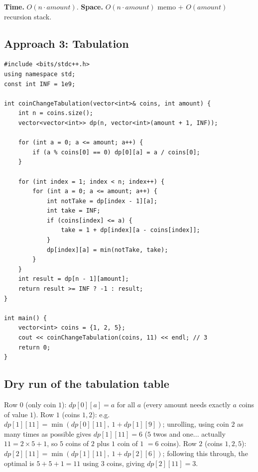 \begin{complexitybox}
\textbf{Time.} $O(n \cdot \textit{amount})$.
\textbf{Space.} $O(n \cdot \textit{amount})$ memo $+$
$O(\textit{amount})$ recursion stack.
\end{complexitybox}

\subsection*{Approach 3: Tabulation}

\begin{lstlisting}
#include <bits/stdc++.h>
using namespace std;
const int INF = 1e9;

int coinChangeTabulation(vector<int>& coins, int amount) {
    int n = coins.size();
    vector<vector<int>> dp(n, vector<int>(amount + 1, INF));

    for (int a = 0; a <= amount; a++) {
        if (a % coins[0] == 0) dp[0][a] = a / coins[0];
    }

    for (int index = 1; index < n; index++) {
        for (int a = 0; a <= amount; a++) {
            int notTake = dp[index - 1][a];
            int take = INF;
            if (coins[index] <= a) {
                take = 1 + dp[index][a - coins[index]];
            }
            dp[index][a] = min(notTake, take);
        }
    }
    int result = dp[n - 1][amount];
    return result >= INF ? -1 : result;
}

int main() {
    vector<int> coins = {1, 2, 5};
    cout << coinChangeTabulation(coins, 11) << endl; // 3
    return 0;
}
\end{lstlisting}

\subsection*{Dry run of the tabulation table}


Row $0$ (only coin $1$): $\textit{dp}[0][a] = a$ for all $a$ (every
amount needs exactly $a$ coins of value $1$). Row $1$ (coins $1,2$):
e.g.\ $\textit{dp}[1][11] = \min(\textit{dp}[0][11],\ 1+\textit{dp}[1][9])$;
unrolling, using coin $2$ as many times as possible gives
$\textit{dp}[1][11]=6$ ($5$ twos and one... actually $11=2\times5+1$,
so $5$ coins of $2$ plus $1$ coin of $1$ $=6$ coins). Row $2$ (coins
$1,2,5$): $\textit{dp}[2][11] = \min(\textit{dp}[1][11],\
1+\textit{dp}[2][6])$; following this through, the optimal is
$5+5+1=11$ using $3$ coins, giving $\textit{dp}[2][11]=3$.

